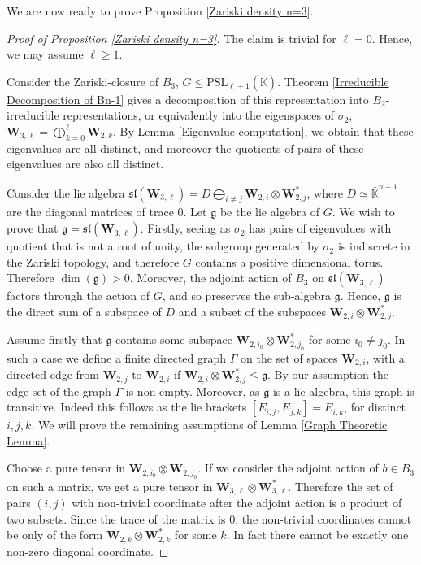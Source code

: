 \documentclass[letterpaper]{amsart}
\begin{document}
We are now ready to prove Proposition \ref{Zariski density n=3}.
\begin{proof}[Proof of Proposition \ref{Zariski density n=3}]
The claim is trivial for $\ell = 0.$ Hence, we may assume $\ell \geq 1.$

Consider the Zariski-closure of $B_3$, $G \leq \mathrm{PSL}_{\ell + 1}(\bar{\mathbb{K}})$. Theorem \ref{Irreducible Decomposition of Bn-1} gives a decomposition of this representation into $B_2$-irreducible representations, or equivalently into the eigenspaces of $\sigma_2$, $\textbf{W}_{3,\ell} = \bigoplus_{k=0}^\ell \textbf{W}_{2, k}$. By Lemma \ref{Eigenvalue computation}, we obtain that these eigenvalues are all distinct, and moreover the quotients of pairs of these eigenvalues are also all distinct.
    
    Consider the lie algebra $\mathfrak{sl}(\textbf{W}_{3,\ell}) = D \bigoplus_{i \neq j} \textbf{W}_{2,i} \otimes \textbf{W}_{2,j}^\ast$, where $D \simeq \bar{\mathbb{K}}^{n-1}$ are the diagonal matrices of trace $0$. Let $\mathfrak{g}$ be the lie algebra of $G$. We wish to prove that $\mathfrak{g} = \mathfrak{sl}(\textbf{W}_{3,\ell})$. Firstly, seeing as $\sigma_2$ has pairs of eigenvalues with quotient that is not a root of unity, the subgroup generated by $\sigma_2$ is indiscrete in the Zariski topology, and therefore $G$ contains a positive dimensional torus. Therefore $\dim(\mathfrak{g}) > 0$. Moreover, the adjoint action of $B_3$ on $\mathfrak{sl}(\textbf{W}_{3,\ell})$ factors through the action of $G$, and so preserves the sub-algebra $\mathfrak{g}$. Hence, $\mathfrak{g}$ is the direct sum of a subspace of $D$ and a subset of the subspaces $\textbf{W}_{2,i} \otimes \textbf{W}_{2,j}^\ast$.

    Assume firstly that $\mathfrak{g}$ contains some subspace $\textbf{W}_{2,i_0} \otimes \textbf{W}_{2,j_0}^\ast$ for some $i_0 \neq j_0$. In such a case we define a finite directed graph $\Gamma$ on the set of spaces $\textbf{W}_{2, i}$, with a directed edge from $\textbf{W}_{2, j}$ to $\textbf{W}_{2, i}$ if $\textbf{W}_{2, i} \otimes \textbf{W}_{2, j}^\ast \leq \mathfrak{g}$. By our assumption the edge-set of the graph $\Gamma$ is non-empty. Moreover, as $\mathfrak{g}$ is a lie algebra, this graph is transitive. Indeed this follows as the lie brackets $[E_{i,j}, E_{j,k}] = E_{i,k}$, for distinct $i, j, k.$ We will prove the remaining assumptions of Lemma \ref{Graph Theoretic Lemma}.
    
    Choose a pure tensor in $\textbf{W}_{2, i_0} \otimes \textbf{W}_{2, j_0}$. If we consider the adjoint action of $b \in B_3$ on such a matrix, we get a pure tensor in $\textbf{W}_{3, \ell} \otimes \textbf{W}_{3, \ell}^\ast.$ Therefore the set of pairs $(i, j)$ with non-trivial coordinate after the adjoint action is a product of two subsets. Since the trace of the matrix is $0$, the non-trivial coordinates cannot be only of the form $\textbf{W}_{2, k} \otimes \textbf{W}_{2, k}^\ast$ for some $k.$ In fact there cannot be exactly one non-zero diagonal coordinate.


\end{proof}
\end{document}
